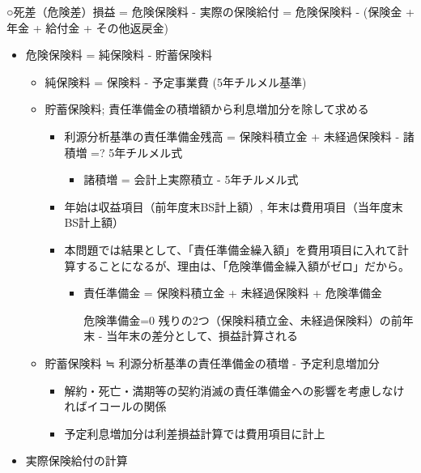 \documentclass[report,gutter=10mm,fore-edge=10mm,uplatex,dvipdfmx]{jlreq}
\begin{document}
○死差（危険差）損益 = 危険保険料 - 実際の保険給付 = 危険保険料 - (保険金
+ 年金 + 給付金 + その他返戻金)

\begin{itemize}
\tightlist
\item
  危険保険料 = 純保険料 - 貯蓄保険料

  \begin{itemize}
  \tightlist
  \item
    純保険料 = 保険料 - 予定事業費 (5年チルメル基準)
  \item
    貯蓄保険料; 責任準備金の積増額から利息増加分を除して求める

    \begin{itemize}
    \tightlist
    \item
      利源分析基準の責任準備金残高 = 保険料積立金 + 未経過保険料 -
      諸積増 =? 5年チルメル式

      \begin{itemize}
      \tightlist
      \item
        諸積増 = 会計上実際積立 - 5年チルメル式
      \end{itemize}
    \item
      年始は収益項目（前年度末BS計上額）,
      年末は費用項目（当年度末BS計上額）
    \item
      本問題では結果として、「責任準備金繰入額」を費用項目に入れて計算することになるが、理由は、「危険準備金繰入額がゼロ」だから。

      \begin{itemize}
      \tightlist
      \item
        責任準備金 = 保険料積立金 + 未経過保険料 + 危険準備金

          危険準備金=0
          残りの2つ（保険料積立金、未経過保険料）の前年末 -
          当年末の差分として、損益計算される
      \end{itemize}
    \end{itemize}
  \item
    貯蓄保険料 ≒ 利源分析基準の責任準備金の積増 - 予定利息増加分

    \begin{itemize}
    \tightlist
    \item
      解約・死亡・満期等の契約消滅の責任準備金への影響を考慮しなければイコールの関係
    \item
      予定利息増加分は利差損益計算では費用項目に計上
    \end{itemize}
  \end{itemize}
\item
  実際保険給付の計算


\end{itemize}
\end{document}
